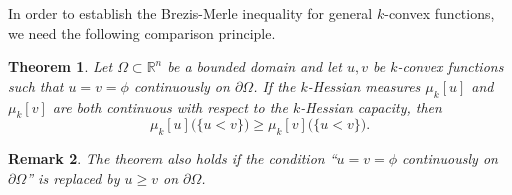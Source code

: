 \documentclass[11pt]{amsart}
\numberwithin{equation}{section}
\newtheorem{theorem}{Theorem}[section]
\newtheorem{remark}[theorem]{Remark}
\numberwithin{equation}{section}
\begin{document}
In order to establish the Brezis-Merle inequality for general $k$-convex functions, we need the following comparison principle.
\begin{theorem}\cite[Theorem 3.3]{TW02}\label{comparison}
	Let $\Omega \subset \mathbb{R}^n$ be a bounded domain and let $u, v$ be $k$-convex functions such that $u = v = \phi$ continuously on $\partial \Omega$. If the $k$-Hessian measures $\mu_k[u]$ and $\mu_k[v]$ are both continuous with respect to the $k$-Hessian capacity, then
	\[
	\mu_k[u]\bigl(\{ u < v \}\bigr) \ge \mu_k[v]\bigl(\{ u < v \}\bigr).
	\]
\end{theorem}
\begin{remark}
	The theorem also holds if the condition ``$u = v = \phi$ continuously on $\partial\Omega$'' is replaced by $u \ge v$ on $\partial\Omega$.
\end{remark}
\end{document}
